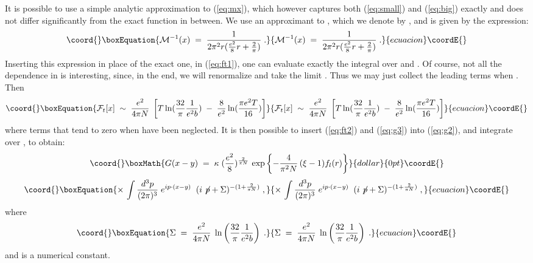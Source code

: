 \documentclass[12pt,a4paper]{article} \usepackage[latin1] {inputenc}
\begin{document}
It is possible to use a simple analytic approximation to
(\ref{eq:mx}), which however captures both (\ref{eq:small}) and
(\ref{eq:big}) exactly and does not differ significantly from the
exact function in between. We use an approximant to \coordHE{}, which
we denote by \coordHE{}, and is given by the expression:
\begin{equation}\coord{}\boxEquation{\label{mapp}
{\mathcal M}^{-1}(x) \;=\; \frac{1}{2 \pi^2 r ( \frac{e^2}{8} r +
    \frac{2}{\pi} ) }\;.
}{{\mathcal M}^{-1}(x) \;=\; \frac{1}{2 \pi^2 r ( \frac{e^2}{8} r +
    \frac{2}{\pi} ) }\;.
}{ecuacion}\coordE{}\end{equation}
Inserting this expression in place of the exact one, \coordHE{} in
(\ref{eq:ft1}), one can evaluate exactly the integral over \myHighlight{$\tau$}\coordHE{} and
\coordHE{}. Of course, not all the dependence in \coordHE{} is interesting,
since, in the end, we will renormalize and take the limit \coordHE{}.
Thus we may just collect the leading terms when \coordHE{}. Then
\begin{equation}\coord{}\boxEquation{\label{eq:ft2}
{\mathcal F}_t[x]\;\sim\; \frac{e^2}{4 \pi N} \; 
\left[ 
T \ln( \frac{32}{\pi} \frac{1}{e^2 b} ) \;-\; \frac{8}{e^2} 
\ln (\frac{\pi e^2 T}{16}) \right]
}{{\mathcal F}_t[x]\;\sim\; \frac{e^2}{4 \pi N} \; 
\left[ 
T \ln( \frac{32}{\pi} \frac{1}{e^2 b} ) \;-\; \frac{8}{e^2} 
\ln (\frac{\pi e^2 T}{16}) \right]
}{ecuacion}\coordE{}\end{equation}
where terms that tend to zero when \coordHE{} have been neglected.
It is then possible to insert (\ref{eq:ft2}) and (\ref{eq:g3}) into
(\ref{eq:g2}), and integrate over \coordHE{}, to obtain:
$$\coord{}\boxMath{
G(x-y) \;=\;\kappa \; (\frac{e^2}{8})^{\frac{2}{\pi N}} \,
\exp\left\{ - \frac{4}{\pi^2 N} \, (\xi -1) f_l(r) \right\}
}{dollar}{0pt}\coordE{}$$
\begin{equation}\coord{}\boxEquation{
\times \, \int \frac{d^3 p}{(2\pi)^3}\; e^{i p \cdot (x-y) } \;
 \;
( i \not \! p + \Sigma )^{-(1 + \frac{2}{\pi N})}\;, 
}{
\times \, \int \frac{d^3 p}{(2\pi)^3}\; e^{i p \cdot (x-y) } \;
 \;
( i \not \! p + \Sigma )^{-(1 + \frac{2}{\pi N})}\;, 
}{ecuacion}\coordE{}\end{equation}
where
\begin{equation}\coord{}\boxEquation{\label{eq:defsigma}
\Sigma \;=\; \frac{e^2}{4 \pi N} \;
\ln\left( \frac{32}{\pi} \frac{1}{e^2 b} \right)\;.
}{\Sigma \;=\; \frac{e^2}{4 \pi N} \;
\ln\left( \frac{32}{\pi} \frac{1}{e^2 b} \right)\;.
}{ecuacion}\coordE{}\end{equation}
and \myHighlight{$\kappa$}\coordHE{} is a numerical constant.
\end{document}
